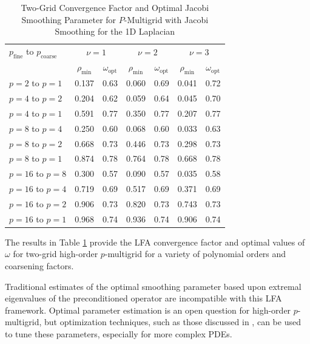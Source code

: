 \begin{table}[ht!]
\begin{center}
\begin{tabular}{l cc cc cc}
  \toprule
  $p_{\text{fine}}$ to $p_{\text{coarse}}$  &  \multicolumn{2}{c}{$\nu = 1$}  &  \multicolumn{2}{c}{$\nu = 2$}  &  \multicolumn{2}{c}{$\nu = 3$}  \\
                       &  $\rho_{\min}$ & $\omega_{\text{opt}}$  &  $\rho_{\min}$ & $\omega_{\text{opt}}$  &  $\rho_{\min}$ & $\omega_{\text{opt}}$  \\
  \toprule
  $p = 2$ to $p = 1$   &  0.137 & 0.63  &  0.060 & 0.69  &  0.041 & 0.72   \\
  \midrule
  $p = 4$ to $p = 2$   &  0.204 & 0.62  &  0.059 & 0.64  &  0.045 & 0.70   \\
  $p = 4$ to $p = 1$   &  0.591 & 0.77  &  0.350 & 0.77  &  0.207 & 0.77   \\
  \midrule
  $p = 8$ to $p = 4$   &  0.250 & 0.60  &  0.068 & 0.60  &  0.033 & 0.63   \\
  $p = 8$ to $p = 2$   &  0.668 & 0.73  &  0.446 & 0.73  &  0.298 & 0.73   \\
  $p = 8$ to $p = 1$   &  0.874 & 0.78  &  0.764 & 0.78  &  0.668 & 0.78   \\
  \midrule
  $p = 16$ to $p = 8$  &  0.300 & 0.57  &  0.090 & 0.57  &  0.035 & 0.58   \\
  $p = 16$ to $p = 4$  &  0.719 & 0.69  &  0.517 & 0.69  &  0.371 & 0.69   \\
  $p = 16$ to $p = 2$  &  0.906 & 0.73  &  0.820 & 0.73  &  0.743 & 0.73   \\
  $p = 16$ to $p = 1$  &  0.968 & 0.74  &  0.936 & 0.74  &  0.906 & 0.74   \\
  \bottomrule
\end{tabular}
\end{center}
\caption{Two-Grid Convergence Factor and Optimal Jacobi Smoothing Parameter for $P$-Multigrid with Jacobi Smoothing for the 1D Laplacian}
\label{table:two_grid_1d}
\end{table}

The results in Table \ref{table:two_grid_1d} provide the LFA convergence factor and optimal values of $\omega$ for two-grid high-order $p$-multigrid for a variety of polynomial orders and coarsening factors.

Traditional estimates of the optimal smoothing parameter based upon extremal eigenvalues of the preconditioned operator are incompatible with this LFA framework.
Optimal parameter estimation is an open question for high-order $p$-multigrid, but optimization techniques, such as those discussed in \cite{brown2021tuning}, can be used to tune these parameters, especially for more complex PDEs.

